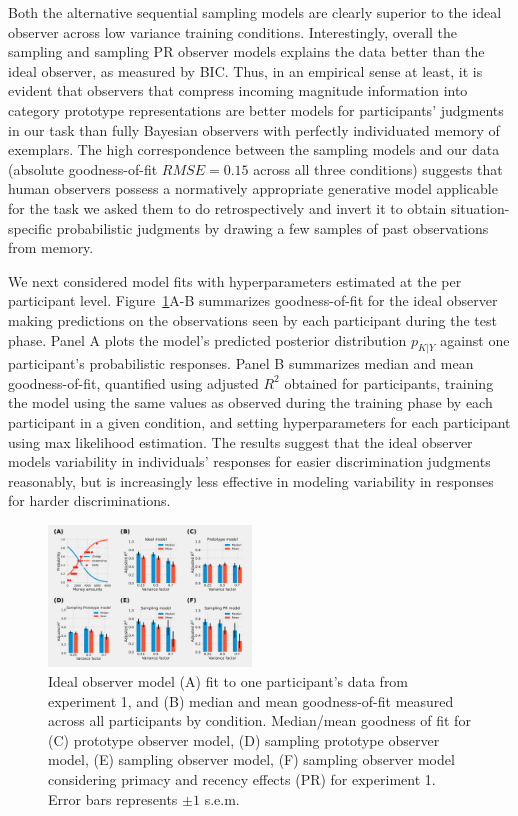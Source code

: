 \documentclass[10pt,letterpaper]{article}
\begin{document}
Both the alternative sequential sampling models are clearly superior to the ideal observer across low variance training conditions. Interestingly, overall the sampling and sampling PR observer models explains the data better than the ideal observer, as measured by BIC. Thus, in an empirical sense at least, it is evident that observers that compress incoming magnitude information into category prototype representations are better models for participants' judgments in our task than fully Bayesian observers with perfectly individuated memory of exemplars. The high correspondence between the sampling models and our data (absolute goodness-of-fit $RMSE=0.15$ across all three conditions) suggests that human observers possess a normatively appropriate generative model applicable for the task we asked them to do retrospectively and invert it to obtain situation-specific probabilistic judgments by drawing a few samples of past observations from memory.  

We next considered model fits with hyperparameters estimated at the per participant level. Figure~\ref{fig:Consolidated_performance}A-B summarizes goodness-of-fit for the ideal observer making predictions on the observations seen by each participant during the test phase. Panel A plots the model's predicted posterior distribution $p_{K|Y}$ against one participant's probabilistic responses. Panel B summarizes median and mean goodness-of-fit, quantified using adjusted $R^2$ obtained for participants, training the model using the same values as observed during the training phase by each participant in a given condition, and setting hyperparameters for each participant using max likelihood estimation. The results suggest that the ideal observer models variability in individuals' responses for easier discrimination judgments reasonably, but is increasingly less effective in modeling variability in responses for harder discriminations. 

\begin{figure}[h!]
    \centering
    \includegraphics[width=0.48\textwidth]{results/Consolidated_performance.pdf}
    \caption{Ideal observer model (A) fit to one participant's data from experiment 1, and (B) median and mean goodness-of-fit measured across all participants by condition. Median/mean goodness of fit for (C) prototype observer model, (D) sampling prototype observer model, (E) sampling observer model, (F) sampling observer model considering primacy and recency effects (PR) for experiment 1. Error bars represents $\pm 1$ s.e.m.} 
    \label{fig:Consolidated_performance}
\end{figure}
\end{document}
